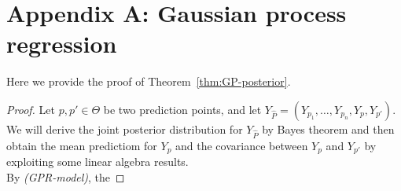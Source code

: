 \section{Appendix A: Gaussian process regression}\label{app:GPR}
Here we provide the proof of Theorem~\ref{thm:GP-posterior}.
\GPpost*
\begin{proof}
    Let $p,p' \in \Theta$ be two prediction points, and let $Y_{\hat{P} } = (Y_{p_1}, \ldots, Y_{p_n}, Y_p, Y_{p'})$. 
    We will derive the joint posterior distribution for $Y_{\hat{P}}$ by Bayes theorem and then obtain the mean predictiom for $Y_p$ and the covariance between $Y_p$ and $Y_{p'}$ by exploiting some linear algebra results. \\
    By \textit{(GPR-model)}, the 


\end{proof}

